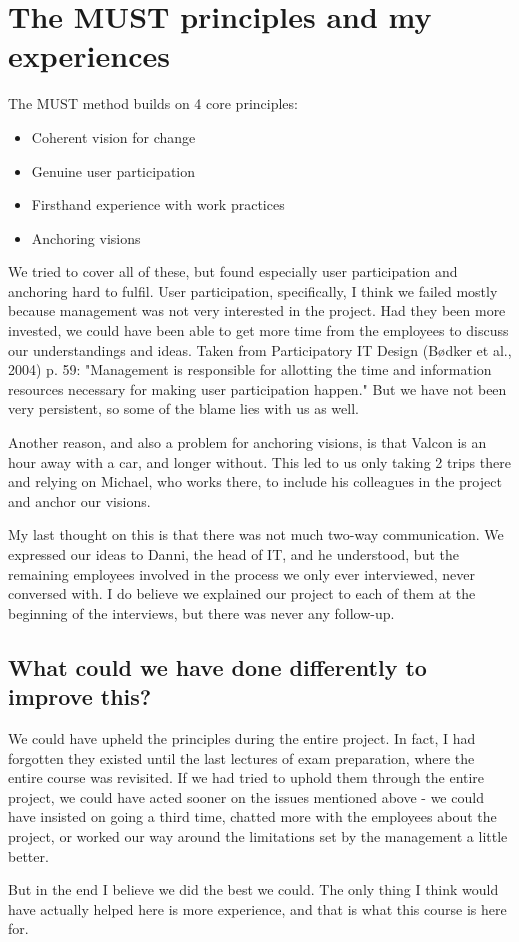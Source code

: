 \section{The MUST principles and my experiences}
The MUST method builds on 4 core principles:
\begin{itemize}
\item Coherent vision for change
\item Genuine user participation
\item Firsthand experience with work practices
\item Anchoring visions
\end{itemize}
We tried to cover all of these, but found especially user participation and anchoring hard to fulfil.
User participation, specifically, I think we failed mostly because management was not very interested in the project.
Had they been more invested, we could have been able to get more time from the employees to discuss our understandings and ideas.
Taken from Participatory IT Design (Bødker et al., 2004) p. 59: "Management is responsible for allotting the time and information resources necessary for making user participation happen."
But we have not been very persistent, so some of the blame lies with us as well.

Another reason, and also a problem for anchoring visions, is that Valcon is an hour away with a car, and longer without.
This led to us only taking 2 trips there and relying on Michael, who works there, to include his colleagues in the project and anchor our visions.

My last thought on this is that there was not much two-way communication.
We expressed our ideas to Danni, the head of IT, and he understood, but the remaining employees involved in the process we only ever interviewed, never conversed with.
I do believe we explained our project to each of them at the beginning of the interviews, but there was never any follow-up.

\subsection{What could we have done differently to improve this?}
We could have upheld the principles during the entire project.
In fact, I had forgotten they existed until the last lectures of exam preparation, where the entire course was revisited.
If we had tried to uphold them through the entire project, we could have acted sooner on the issues mentioned above - we could have insisted on going a third time, chatted more with the employees about the project, or worked our way around the limitations set by the management a little better.

But in the end I believe we did the best we could.
The only thing I think would have actually helped here is more experience, and that is what this course is here for.